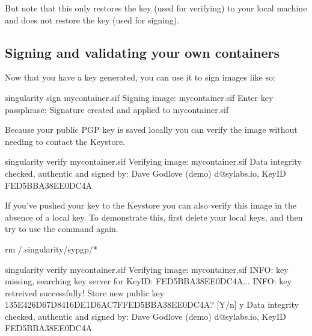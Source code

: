 \documentclass[letterpaper,10pt,english]{sphinxmanual}
\begin{document}
But note that this only restores the  key (used for verifying) to your
local machine and does not restore the  key (used for signing).


\subsection{Signing and validating your own containers}
\label{\detokenize{signNverify:signing-and-validating-your-own-containers}}
Now that you have a key generated, you can use it to sign images like so:

%
\begin{sphinxVerbatim}[commandchars=\\\{\}]
\PYGZdl{} singularity sign my\PYGZus{}container.sif
Signing image: my\PYGZus{}container.sif
Enter key passphrase:
Signature created and applied to my\PYGZus{}container.sif
\end{sphinxVerbatim}

Because your public PGP key is saved locally you can verify the image without
needing to contact the Keystore.

%
\begin{sphinxVerbatim}[commandchars=\\\{\}]
\PYGZdl{} singularity verify my\PYGZus{}container.sif
Verifying image: my\PYGZus{}container.sif
Data integrity checked, authentic and signed by:
    Dave Godlove (demo) \PYGZlt{}d@sylabs.io\PYGZgt{}, KeyID FED5BBA38EE0DC4A
\end{sphinxVerbatim}

If you’ve pushed your key to the Keystore you can also verify this image in the
absence of a local key.  To demonstrate this, first delete your local keys, and
then try to use the  command again.

%
\begin{sphinxVerbatim}[commandchars=\\\{\}]
\PYGZdl{} rm \PYGZti{}/.singularity/sypgp/*

\PYGZdl{} singularity verify my\PYGZus{}container.sif
Verifying image: my\PYGZus{}container.sif
INFO:    key missing, searching key server for KeyID: FED5BBA38EE0DC4A...
INFO:    key retreived successfully!
Store new public key 135E426D67D8416DE1D6AC7FFED5BBA38EE0DC4A? [Y/n] y
Data integrity checked, authentic and signed by:
    Dave Godlove (demo) \PYGZlt{}d@sylabs.io\PYGZgt{}, KeyID FED5BBA38EE0DC4A
\end{sphinxVerbatim}
\end{document}
